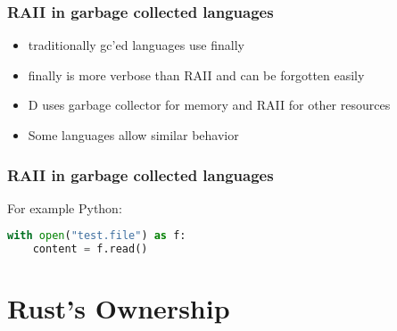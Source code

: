\documentclass[xcolor=colortbl
]{beamer}
\begin{document}
\begin{frame}
\end{frame}


\begin{frame}
\end{frame}

\begin{frame}
    \frametitle{RAII in garbage collected languages}
    \begin{itemize}
        \item traditionally gc'ed languages use finally
        \item finally is more verbose than RAII and can be forgotten easily
        \item D uses garbage collector for memory and RAII for other resources
        \item Some languages allow similar behavior
    \end{itemize}
\end{frame}


\begin{frame}[fragile]
    \frametitle{RAII in garbage collected languages}
    For example Python:
    \begin{lstlisting}[language=python,frame=single]
with open("test.file") as f:
    content = f.read()
    \end{lstlisting}
\end{frame}

\section{Rust's Ownership}
\end{document}
